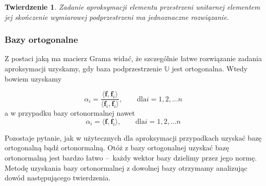 \documentclass[12pt]{mwbk}
\theoremstyle{plain}
\newtheorem{twier}{Twierdzenie}[chapter] %
\theoremstyle{definition}
\theoremstyle{remark}
\newcommand{\ff}{\mathbf{f}}
\newcommand{\skalar}[2]{\pmb{\langle}#1,#2\pmb{\rangle}}
\begin{document}
\begin{twier}
	Zadanie aproksymacji elementu przestrzeni unitarnej elementem
	jej skończenie wymiarowej podprzestrzeni ma jednoznaczne
	rozwiązanie.
\end{twier}

\subsubsection{Bazy ortogonalne}
Z postaci jaką ma macierz Grama widać, że szczególnie łatwe rozwiązanie zadania
aproksymacji uzyskamy, gdy baza podprzestrzenie $\mathbb{U}$ jest ortogonalna.
Wtedy bowiem uzyskamy


\[
\alpha_i=\frac{\skalar{\ff}{\ff_i}}{\skalar{\ff_i}{\ff_i}},\qquad\text{dla
$i=1,2,\ldots n$}
\]
a w przypadku bazy ortonormalnej nawet
\[
\alpha_i=\skalar{\ff}{\ff_i},\qquad\text{dla
$i=1,2,\ldots n$}
\]


Pozostaje pytanie, jak w użytecznych dla aproksymacji przypadkach uzyskać bazę
ortogonalną bądź ortonormalną. Otóż z bazy ortogonalnej uzyskać bazę
ortonormalną jest bardzo łatwo --~każdy wektor bazy dzielimy przez
jego normę. Metodę uzyskania bazy ortonormalnej z dowolnej bazy
otrzymamy analizując dowód następującego twierdzenia.
\end{document}
